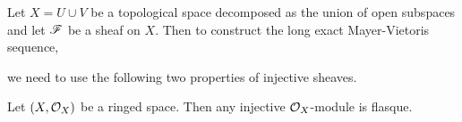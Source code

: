\documentclass[12pt]{article}
\begin{document}
Let $X = U \cup V$ be a topological space decomposed as the union of open subspaces and let $\mathscr{F}$ be a sheaf on $X$. Then to construct the long exact Mayer-Vietoris sequence, 
\begin{center}
\end{center}
we need to use the following two properties of injective sheaves.

\begin{proposition}
Let $(X, \mathcal{O}_{X})$ be a ringed space. Then any injective $\mathcal{O}_{X}$-module is flasque.
\end{proposition}
\end{document}
